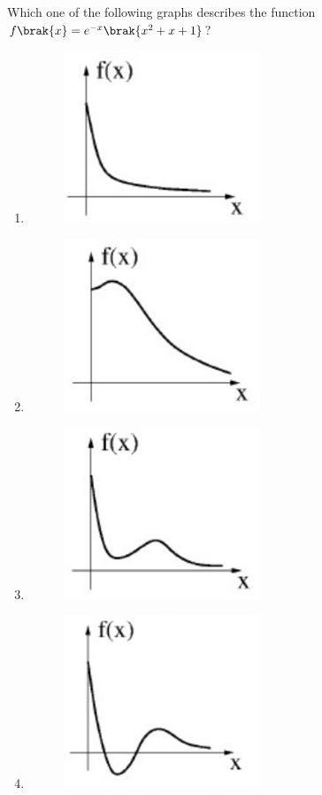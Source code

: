     \item Which one of the following graphs describes the function $f\brak{x}=e^{-x}\brak{x^{2}+x+1}$?
    \begin{enumerate}
        \item \begin{figure}[H]\centering\includegraphics[width=0.4\columnwidth]{figs/q38A.png}\end{figure}
        \item \begin{figure}[H]\centering\includegraphics[width=0.4\columnwidth]{figs/q38B.png}\end{figure}
        \item \begin{figure}[H]\centering\includegraphics[width=0.4\columnwidth]{figs/q38C.png}\end{figure}
        \item \begin{figure}[H]\centering\includegraphics[width=0.4\columnwidth]{figs/q38D.png}\end{figure}
    \end{enumerate}
    
